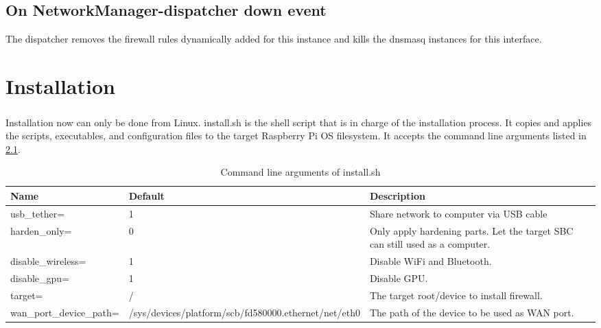 \documentclass[mscthesis]{usiinfthesis}
\begin{document}
\section{On NetworkManager-dispatcher down event}
The dispatcher removes the firewall rules dynamically added for this instance and kills the dnsmasq instances for this interface.

\chapter{Installation}
\paragraph{}
Installation now can only be done from Linux. install.sh is the shell script that is in charge of the installation process. It copies and applies the scripts, executables, and configuration files to the target Raspberry Pi OS filesystem. It accepts the command line arguments listed in \cref{tab:install_arg}.

\begin{table}[H]
  \centering
  \begin{tabular}{|m{27mm}|m{30mm}|m{68mm}|}
    \hline
    Name                              & Default                                                                         & Description                                                                  \\
    \hline
    usb\_tether=                      & 1                                                                               & Share network to computer via USB cable                                      \\
    harden\_only=                     & 0                                                                               & Only apply hardening parts. Let the target SBC can still used as a computer. \\
    disable\_wireless=                & 1                                                                               & Disable WiFi and Bluetooth.                                                  \\
    disable\_gpu=                     & 1                                                                               & Disable GPU.                                                                 \\
    target=                           & /                                                                               & The target root/device to install firewall.                                  \\
    wan\_port\_\newline device\_path= & /sys/devices/\newline platform/scb/\newline fd580000.ethernet/\newline net/eth0 & The path of the device to be used as WAN port.                               \\
    \hline
  \end{tabular}
  \caption{Command line arguments of install.sh}
  \label{tab:install_arg}
\end{table}
\end{document}
